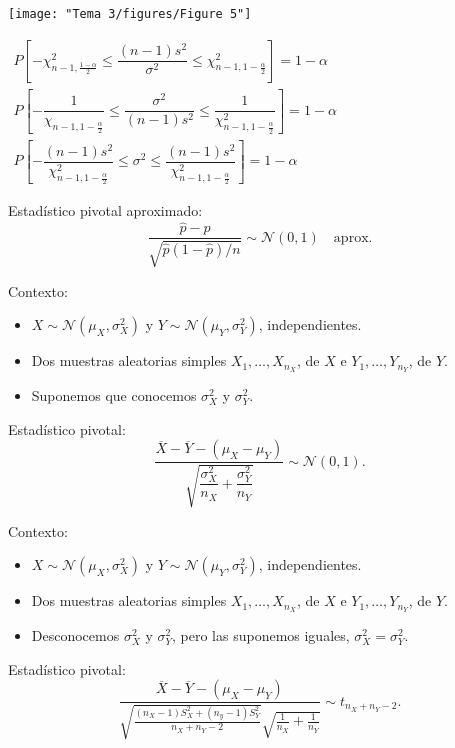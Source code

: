 \begin{minipage}{0.45\textwidth}
    \texttt{[image: "Tema 3/figures/Figure 5"]}
\end{minipage}
$\begin{array}{l}
    P\left[ -\chi_{n-1,\frac{1-\alpha}{2} }^2\le \dfrac{(n-1)s^2}{\sigma^2}\le \chi_{n-1,1-\frac{\alpha}{2} }^2 \right] =1-\alpha\\
    P\left[ -\dfrac{1}{\chi_{n-1,1-\frac{\alpha}{2}}} \le  \dfrac{\sigma^2}{(n-1)s^2}\le \dfrac{1}{\chi_{n-1,1-\frac{\alpha}{2} }^2} \right] =1-\alpha\\
    P\left[ -\dfrac{(n-1)s^2}{\chi_{n-1,1-\frac{\alpha}{2} }^2}\le \sigma^2\le \dfrac{(n-1)s^2}{\chi_{n-1,1-\frac{\alpha}{2} }^2} \right] =1-\alpha
\end{array}$
\begin{tcolorbox}[colback=blue!5!white, colframe=blue!75!black, title=\textbf{$X\sim \mathrm{Bernoulli}$, estimamos $p$}]
Estadístico pivotal aproximado: \[
    \dfrac{\hat{p}-p}{\sqrt{\hat{p}(1-\hat{p}) / n} }\sim \mathcal{N}(0,1)\quad \mathrm{aprox}.
\] 
\end{tcolorbox}
\begin{tcolorbox}[colback=blue!5!white, colframe=blue!75!black, title=\textbf{Diferencias de dos variables aleatorias normales}]
Contexto:
\begin{itemize}[label=\textbullet]
\item $X\sim \mathcal{N}(\mu_X,\sigma_X^2)$ y $Y\sim \mathcal{N}(\mu_Y,\sigma_Y^2)$, independientes.
\item Dos muestras aleatorias simples $X_1,\dots,X_{n_X}$, de $X$ e  $Y_1,\dots,Y_{n_Y}$, de $Y$.
\item Suponemos que conocemos $\sigma_{X}^2$ y $\sigma_Y^2$.
\end{itemize}
Estadístico pivotal: \[
\dfrac{\overline{X}-\overline{Y}-(\mu_X-\mu_Y)}{\sqrt{\dfrac{\sigma_X^2}{n_X}+ \dfrac{\sigma_Y^2}{n_Y}} }\sim \mathcal{N}(0,1).
\] 
\end{tcolorbox}
\begin{tcolorbox}[colback=blue!5!white, colframe=blue!75!black, title=\textbf{Diferencias de dos variables aleatorias normales}]
Contexto:
\begin{itemize}[label=\textbullet]
\item $X\sim \mathcal{N}(\mu_X,\sigma_X^2)$ y $Y\sim \mathcal{N}(\mu_Y,\sigma_Y^2)$, independientes.
\item Dos muestras aleatorias simples $X_1,\dots,X_{n_X}$, de $X$ e  $Y_1,\dots,Y_{n_Y}$, de $Y$.
\item Desconocemos $\sigma_X^2$ y $\sigma_Y^2$, pero las suponemos iguales, $\sigma_X^2=\sigma_Y^2$.
\end{itemize}
Estadístico pivotal: \[
    \dfrac{\overline{X}-\overline{Y}-(\mu_X-\mu_Y)}{\sqrt{\frac{(n_{X}-1)S_X^2+(n_y-1)S_Y^2}{n_X+n_Y-2} }\sqrt{\frac{1}{n_X} +\frac{1}{n_Y} }  }\sim  t_{n_X+n_Y-2}.
\] 
\end{tcolorbox}
